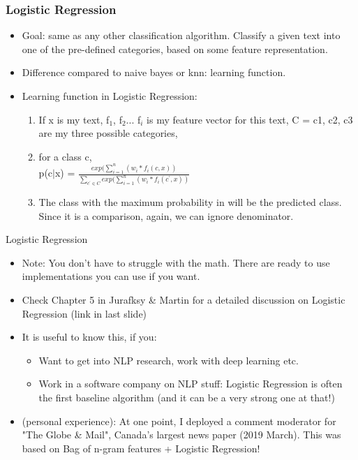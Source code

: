 \documentclass{beamer}
\begin{document}
\begin{frame}
\frametitle{Logistic Regression}
\begin{itemize}
\item Goal: same as any other classification algorithm. Classify a given text into one of the pre-defined categories, based on some feature representation.
\item Difference compared to naive bayes or knn: learning function.
\item Learning function in Logistic Regression:
\begin{enumerate}
\item If x is my text, f$_1$, f$_2$... f$_i$ is my feature vector for this text, C = {c1, c2, c3} are my three possible categories, \pause
\item for a class c,\\ p(c$|$x) = $\frac{exp(\sum_{i=1}^n (w_i*f_i(c,x))} {\sum_{c^\prime \in C} exp(\sum_{i=1}^n (w_i*f_i(c^\prime,x))}$
\item The class with the maximum probability in will be the predicted class. Since it is a comparison, again, we  can ignore denominator.
\end{enumerate}
\end{itemize}
\end{frame}

\begin{frame}{Logistic Regression}
    \begin{itemize}
        \item Note: You don't have to struggle with the math. There are ready to use implementations you can use if you want. 
        \item Check Chapter 5 in Jurafksy \& Martin for a detailed discussion on Logistic Regression (link in last slide)
        \item It is useful to know this, if you:
        \begin{itemize}
            \item Want to get into NLP research, work with deep learning etc.
            \item Work in a software company on NLP stuff: Logistic Regression is often the first baseline algorithm (and it can be a very strong one at that!)
        \end{itemize} \pause 
        \item (personal experience): At one point, I deployed a comment moderator for "The Globe \& Mail", Canada's largest news paper (2019 March). This was based on Bag of n-gram features + Logistic Regression!
    \end{itemize}
\end{frame}
\end{document}

